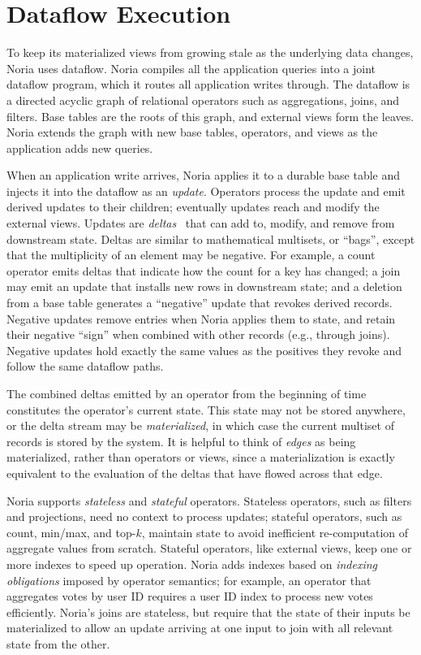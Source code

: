 \section{Dataflow Execution}

To keep its materialized views from growing stale as the underlying data
changes, Noria uses dataflow. Noria compiles all the application queries into a
joint dataflow program, which it routes all application writes through. The
dataflow is a directed acyclic graph of relational operators such as
aggregations, joins, and filters. Base tables are the roots of this graph, and
external views form the leaves. Noria extends the graph with new base tables,
operators, and views as the application adds new queries.

When an application write arrives, Noria applies it to a durable base table and
injects it into the dataflow as an \emph{update}. Operators process the update
and emit derived updates to their children; eventually updates reach and modify
the external views. Updates are \emph{deltas}~\cite{roll, differential-dataflow}
that can add to, modify, and remove from downstream state. Deltas are similar to
mathematical multisets, or ``bags'', except that the multiplicity of an element
may be negative. For example, a count operator emits deltas that indicate how
the count for a key has changed; a join may emit an update that installs new
rows in downstream state; and a deletion from a base table generates a
``negative'' update that revokes derived records. Negative updates remove
entries when Noria applies them to state, and retain their negative ``sign''
when combined with other records (e.g., through joins). Negative updates hold
exactly the same values as the positives they revoke and follow the same
dataflow paths.

The combined deltas emitted by an operator from the beginning of time
constitutes the operator's current state. This state may not be stored anywhere,
or the delta stream may be \textit{materialized}, in which case the current
multiset of records is stored by the system. It is helpful to think of
\emph{edges} as being materialized, rather than operators or views, since a
materialization is exactly equivalent to the evaluation of the deltas that have
flowed across that edge.

Noria supports \emph{stateless} and \emph{stateful} operators. Stateless
operators, such as filters and projections, need no context to process updates;
stateful operators, such as count, min/max, and top-$k$, maintain state to avoid
inefficient re-computation of aggregate values from scratch. Stateful operators,
like external views, keep one or more indexes to speed up operation. Noria adds
indexes based on \emph{indexing obligations} imposed by operator semantics; for
example, an operator that aggregates votes by user ID requires a user ID index
to process new votes efficiently. Noria's joins are stateless, but require that
the state of their inputs be materialized to allow an update arriving at one
input to join with all relevant state from the other.

